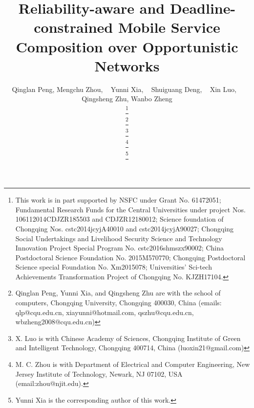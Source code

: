 \documentclass[journal]{IEEEtran}
\begin{document}
\title{Reliability-aware and Deadline-constrained Mobile Service Composition over Opportunistic Networks}

\author{Qinglan Peng,
        Mengchu Zhou, ~
        Yunni Xia, ~
        Shuiguang Deng, ~
        Xin Luo, ~
        Qingsheng Zhu,
        Wanbo Zheng


\thanks{This work is in part supported by NSFC under Grant No. 61472051; Fundamental Research Funds for the Central Universities under project Nos. 106112014CDJZR185503 and CDJZR12180012; Science foundation of
Chongqing Nos. cstc2014jcyjA40010 and cstc2014jcyjA90027; Chongqing Social Undertakings and Livelihood Security Science and Technology Innovation Project Special Program No. cstc2016shmszx90002; China Postdoctoral Science Foundation No. 2015M570770; Chongqing Postdoctoral Science special Foundation No. Xm2015078; Universities’ Sci-tech Achievements Transformation Project of Chongqing No. KJZH17104.}

\thanks{Qinglan Peng, Yunni Xia, and Qingsheng Zhu are with the school of computers, Chongqing University, Chongqing 400030, China (emails: qlp@cqu.edu.cn, xiayunni@hotmail.com, qszhu@cqu.edu.cn, wbzheng2008@cqu.edu.cn)}

\thanks{X. Luo is with Chinese Academy of Sciences, Chongqing Institute of Green and Intelligent
Technology, Chongqing 400714, China (luoxin21@gmail.com)}

\thanks{M. C. Zhou is with Department of Electrical and Computer Engineering, New Jersey Institute of Technology, Newark, NJ 07102, USA (email:zhou@njit.edu).}

\thanks{Yunni Xia is the corresponding author of this work.}
}




\maketitle
\end{document}
